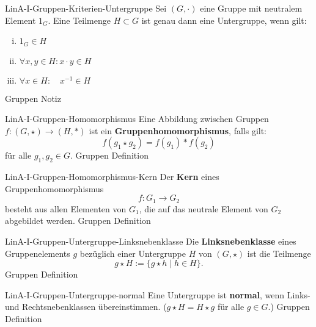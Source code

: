 \documentclass[10pt]{article}
\begin{document}
\begin{note}{LinA-I-Gruppen-Kriterien-Untergruppe}
  \field
  \field
  Sei \((G,\cdot)\) eine Gruppe mit neutralem Element \(1_G\). Eine Teilmenge \(H\subset G\) ist genau dann eine Untergruppe, wenn gilt:
  \begin{center}
    \begin{enumerate}[(i)]
    \item {}\(1_G \in H\)\clend
    \item {}\(\forall x,y\in H\colon x\cdot y \in H\)\clend
    \item {}\(\forall x\in H\colon \quad x^{-1} \in H\)\clend
    \end{enumerate}
  \end{center}
  \field
  \field Gruppen
  \field Notiz    
\end{note}

\begin{note}{LinA-I-Gruppen-Homomorphismus}
  \field
  \field
  Eine Abbildung zwischen Gruppen \(f\colon (G,\star)\to(H,\ast)\) ist ein \textbf{Gruppenhomomorphismus}, falls gilt:
  \[
    f(g_1\star g_2) = f(g_1)\ast f(g_2)
  \]
  für alle \(g_1,g_2 \in G\).
  \clend
  \field
  \field Gruppen
  \field Definition   
\end{note}

\begin{note}{LinA-I-Gruppen-Homomorphismus-Kern}
  \field
  \field
  Der \textbf{Kern} eines Gruppenhomomorphismus \[f\colon G_1\to G_2\] besteht aus allen Elementen von \(G_1\), die auf das neutrale Element von \(G_2\) abgebildet werden.\clend
  \field
  \field Gruppen    
  \field Definition
\end{note}

\begin{note}{LinA-I-Gruppen-Untergruppe-Linksnebenklasse}
  \field
  \field
  Die \textbf{Linksnebenklasse} eines Gruppenelements \(g\) bezüglich einer Untergruppe \(H\) von \((G,\star)\) ist die Teilmenge
  \[
    g\star H := \{g\star h \mid h\in H\}.
  \]
  \clend
  \field
  \field Gruppen
  \field Definition    
\end{note}

\begin{note}{LinA-I-Gruppen-Untergruppe-normal}
  \field
  \field
  Eine Untergruppe ist \textbf{normal}, wenn Links- und Rechtsnebenklassen übereinstimmen.\clend
  \field
  (\(g\star H = H\star g\) für alle \(g\in G\).)
  \field Gruppen
  \field Definition    
\end{note}
\end{document}
